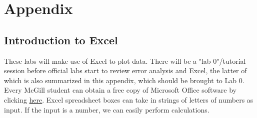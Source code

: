 \documentclass[12pt]{report}
\begin{document}
\part{Appendix}
\label{Part:Appendix}
\begin{appendix}


\chapter{Introduction to Excel}
\label{App:Excel}

These labs will make use of Excel to plot data. There will be a "lab 0"/tutorial session before official labs start to review error analysis and Excel, the latter of which is also summarized in this appendix, which should be brought to Lab 0. Every McGill student can obtain a free copy of Microsoft Office software by clicking \href{http://kb.mcgill.ca/kb/article?ArticleId=5172&source=Article&c=12&cid=2}{here}. Excel spreadsheet boxes can take in strings of letters of numbers as input. If the input is a number, we can easily perform calculations.\\


\end{appendix}
\end{document}
